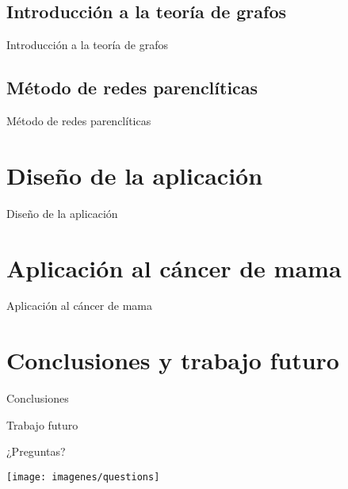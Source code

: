 \documentclass[hyperref={unicode}]{beamer}
\begin{document}
\subsection{Introducción a la teoría de grafos}
\begin{frame}{Introducción a la teoría de grafos}
	
\end{frame}

\subsection{Método de redes parenclíticas}
\begin{frame}{Método de redes parenclíticas}
	
\end{frame}

\section{Diseño de la aplicación}
\begin{frame}{Diseño de la aplicación}
	
\end{frame}

\section{Aplicación al cáncer de mama}
\begin{frame}{Aplicación al cáncer de mama}
	
\end{frame}

\section{Conclusiones y trabajo futuro}
\begin{frame}{Conclusiones}
	
\end{frame}

\begin{frame}{Trabajo futuro}
	
\end{frame}

\begin{frame}{¿Preguntas?}
	
	{%
		\centering
		\texttt{[image: imagenes/questions]}
	}


\end{frame}
\end{document}
